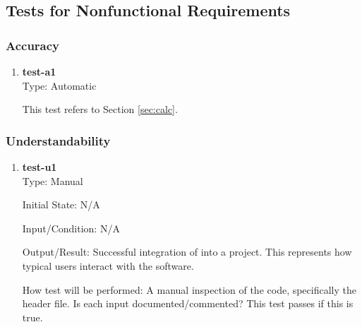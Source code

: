 \documentclass[12pt, titlepage]{article}
\newcommand{\Tthetestnum}{T\thetestnum}
\begin{document}
\subsection{Tests for Nonfunctional Requirements}




\subsubsection{Accuracy}
		

\begin{enumerate}

\item[\refstepcounter{testnum} \Tthetestnum \label{t:a1}:] \textbf{test-a1} \\

    Type: Automatic
            
    This test refers to Section \ref{sec:calc}.
\end{enumerate}

\subsubsection{Understandability}

\begin{enumerate}

\item[\refstepcounter{testnum} \Tthetestnum \label{t:u1}:] \textbf{test-u1} \\

    Type: Manual
            
    Initial State: N/A
            
    Input/Condition: N/A
            
    Output/Result: Successful integration of \progname{} into a project. This represents how typical
    users interact with the software.
            
    How test will be performed: A manual inspection of the code, specifically the header file. Is
    each input documented/commented? This test passes if this is true.
\end{enumerate}
\end{document}
